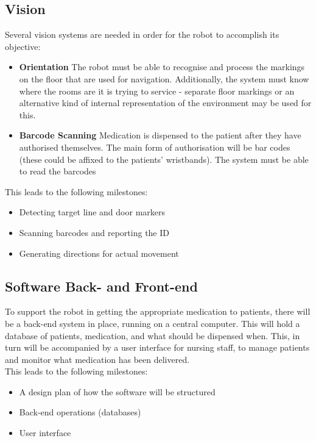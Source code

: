 \documentclass[a4paper,10pt,DIV10,openright,openbib]{scrreprt}
\begin{document}
\subsection{Vision}
Several vision systems are needed in order for the robot to accomplish its objective:
\begin{itemize}
  \item \textbf{Orientation}
The robot must be able to recognise and process the markings on the floor that
are used for navigation. Additionally, the system must know where the rooms are
it is trying to service - separate floor markings or an alternative kind of
internal representation of the environment may be used for this.
  \item \textbf{Barcode Scanning}
Medication is dispensed to the patient after they have authorised themselves.
The main form of authorisation will be bar codes (these could be affixed to the
patients' wristbands). The system must be able to read the barcodes
\end{itemize}
This leads to the following milestones:
\begin{itemize}
  \item Detecting target line and door markers
  \item Scanning barcodes and reporting the ID
  \item Generating directions for actual movement
\end{itemize}

\subsection{Software Back- and Front-end}
To support the robot in getting the appropriate medication to patients, there will
be a back-end system in place, running on a central computer. This will hold a 
database of patients, medication, and what should be dispensed when. This, in
turn will be accompanied by a user interface for nursing staff, to manage patients
and monitor what medication has been delivered. \\
This leads to the following milestones:
\begin{itemize}
  \item A design plan of how the software will be structured
  \item Back-end operations (databases)
  \item User interface
\end{itemize}
\end{document}

